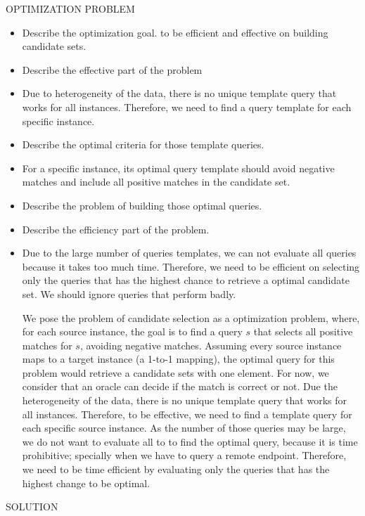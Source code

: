 OPTIMIZATION PROBLEM
\begin{itemize}
\item Describe the optimization goal. to be efficient and effective on building candidate sets.
\item Describe the effective part of the problem
\item Due to heterogeneity of the data, there is no unique template query that works for all instances. Therefore, we need to find a query template for each specific instance. 
\item Describe the optimal criteria for those template queries. 
\item For a specific instance, its optimal query template should avoid negative matches and include all positive matches in the candidate set. 
\item Describe the problem of building those optimal queries.
\item Describe the efficiency part of the problem. 
\item Due to the large number of queries templates, we can not evaluate all queries because it takes too much time. Therefore, we need to be efficient on selecting only the queries that has the highest chance to retrieve a optimal candidate set. We should ignore queries that perform badly.

We pose the problem of candidate selection as a optimization problem, where, for each source instance, the goal is to find a query $s$ that  selects all positive matches for $s$, avoiding negative matches. Assuming every source instance maps to a target instance (a 1-to-1 mapping), the optimal query for this problem would retrieve a candidate sets with one element. For now, we consider that an oracle can decide if the match is correct or not. Due the heterogeneity of the data, there is no unique template query that works for all instances. Therefore, to be effective, we need to find a template query for each specific source instance.  As the number of those queries may be large, we do not want  to evaluate all to to find the optimal query, because it is time prohibitive; specially when we have to query a remote endpoint. Therefore, we need to be time efficient by evaluating only the queries that has the highest change to be optimal.
\end{itemize}

SOLUTION

